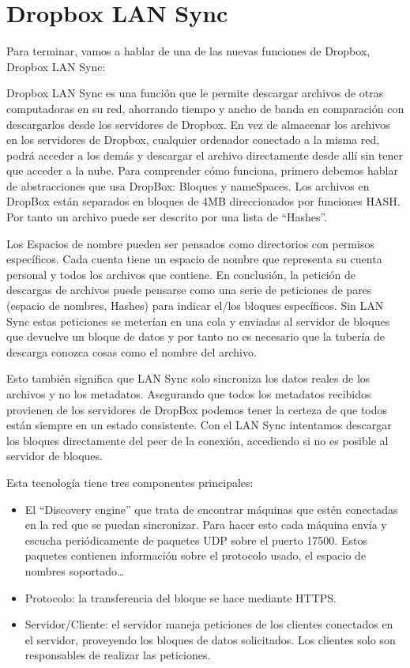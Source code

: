\section{Dropbox LAN Sync}

Para terminar, vamos a hablar de una de las nuevas funciones de Dropbox, Dropbox LAN Sync:

Dropbox LAN Sync es una función que le permite descargar archivos de otras computadoras en su red, ahorrando tiempo y ancho de banda en comparación con descargarlos desde los servidores de Dropbox.
En vez de almacenar los archivos en los servidores de Dropbox, cualquier ordenador conectado a la misma red, podrá acceder a los demás  y descargar el archivo directamente desde allí sin tener que acceder a la nube.
Para comprender cómo funciona, primero debemos hablar de abstracciones que usa DropBox: Bloques y nameSpaces. Los archivos en DropBox están separados en bloques de 4MB direccionados por funciones HASH. Por tanto un archivo puede ser descrito por una lista de “Hashes”.

Los Espacios de nombre pueden ser pensados como directorios con permisos específicos. Cada cuenta tiene un espacio de nombre que representa su cuenta personal  y todos los archivos que contiene. 
En conclusión,  la petición de descargas de archivos puede pensarse como una serie de peticiones de pares (espacio de nombres, Hashes) para indicar el/los bloques específicos. Sin LAN Sync estas peticiones se meterían en una cola  y enviadas al servidor de bloques que devuelve un bloque de datos y por tanto no es necesario que la tubería de descarga conozca cosas como el nombre del archivo.

Esto también significa que LAN Sync  solo sincroniza los datos reales de los archivos  y no los metadatos. Asegurando que todos los metadatos recibidos provienen de los servidores de DropBox podemos tener la certeza de que todos están siempre en un estado consistente. Con el LAN Sync intentamos descargar los bloques directamente del peer de la conexión, accediendo si no es posible al servidor de bloques.

Esta tecnología tiene tres componentes principales:
\begin{itemize}
\item El “Discovery engine” que trata de encontrar máquinas que estén conectadas en la red que se puedan sincronizar. Para hacer esto cada máquina envía y escucha periódicamente de paquetes UDP sobre el puerto 17500. Estos paquetes contienen información sobre el protocolo usado, el espacio de nombres soportado…
\item Protocolo:  la transferencia del bloque se hace mediante HTTPS.
\item Servidor/Cliente: el servidor maneja peticiones de los clientes conectados en el servidor, proveyendo los bloques de datos solicitados. Los clientes solo son responsables de realizar las peticiones.  
\end{itemize}

